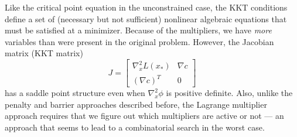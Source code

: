 \documentclass[12pt, leqno]{article} %
\begin{document}
Like the critical point equation in the unconstrained case, the KKT
conditions define a set of (necessary but not sufficient) nonlinear
algebraic equations that must be satisfied at a minimizer.  Because of
the multipliers, we have {\em more} variables than were present in
the original problem.  However, the Jacobian matrix (KKT matrix)
\[
J = \begin{bmatrix}
  \nabla^2_x L(x_*) & \nabla c \\
  (\nabla c)^T & 0
\end{bmatrix}
\]
has a saddle point structure even when $\nabla^2_x \phi$ is positive
definite.  Also, unlike the penalty and barrier approaches described
before, the Lagrange multiplier approach requires that we figure out
which multipliers are active or not --- an approach that seems to lead
to a combinatorial search in the worst case.
\end{document}
